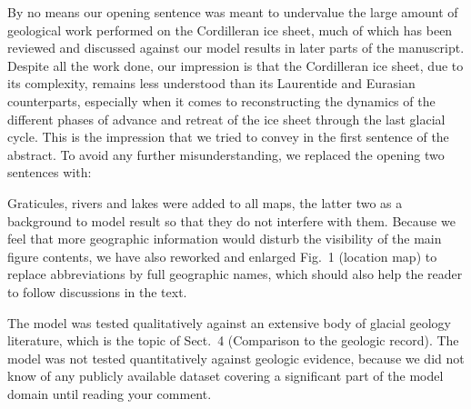 By no means our opening sentence was meant to undervalue the large amount of
geological work performed on the Cordilleran ice sheet, much of which has been
reviewed and discussed against our model results in later parts of the
manuscript. Despite all the work done, our impression is that the Cordilleran
ice sheet, due to its complexity, remains less understood than its Laurentide
and Eurasian counterparts, especially when it comes to reconstructing the
dynamics of the different phases of advance and retreat of the ice sheet
through the last glacial cycle. This is the impression that we tried to convey
in the first sentence of the abstract. To avoid any further misunderstanding,
we replaced the opening two sentences with:



Graticules, rivers and lakes were added to all maps, the latter two as a
background to model result so that they do not interfere with them. Because we
feel that more geographic information would disturb the visibility of the main
figure contents, we have also reworked and enlarged Fig.~1 (location map) to
replace abbreviations by full geographic names, which should also help the
reader to follow discussions in the text.


The model was tested qualitatively against an extensive body of glacial
geology literature, which is the topic of Sect.~4 (Comparison to the geologic
record). The model was not tested quantitatively against geologic evidence,
because we did not know of any publicly available dataset covering a
significant part of the model domain until reading your comment.

